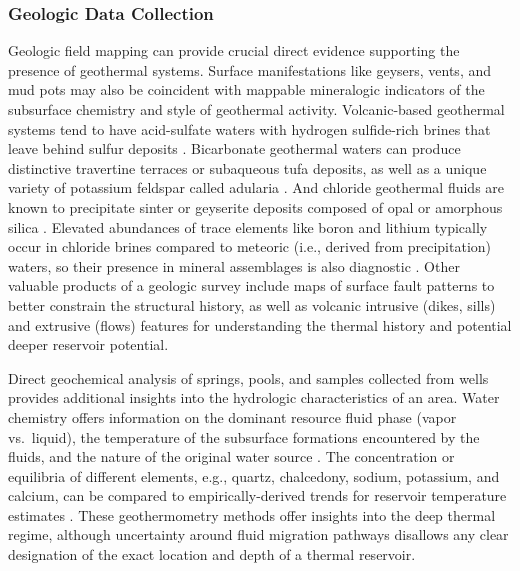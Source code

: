 \subsubsection{Geologic Data Collection}\label{ch2:geologic_data}
Geologic field mapping can provide crucial direct evidence supporting the presence of geothermal systems. Surface manifestations like geysers, vents, and mud pots may also be coincident with mappable mineralogic indicators of the subsurface chemistry and style of geothermal activity. Volcanic-based geothermal systems tend to have acid-sulfate waters with hydrogen sulfide-rich brines that leave behind sulfur deposits \citep[p.\ 123]{glassley_geothermal_2015}. Bicarbonate geothermal waters can produce distinctive travertine terraces or subaqueous tufa deposits, as well as a unique variety of potassium feldspar called adularia \citep[p.\ 125]{glassley_geothermal_2015}. And chloride geothermal fluids are known to precipitate sinter or geyserite deposits composed of opal or amorphous silica \citep[p.\ 125]{glassley_geothermal_2015}. Elevated abundances of trace elements like boron and lithium typically occur in chloride brines compared to meteoric (i.e., derived from precipitation) waters, so their presence in mineral assemblages is also diagnostic \citep{bielicki_hydrogeolgic_2015, millot_multi-isotopic_2007}. Other valuable products of a geologic survey include maps of surface fault patterns to better constrain the structural history, as well as volcanic intrusive (dikes, sills) and extrusive (flows) features for understanding the thermal history and potential deeper reservoir potential.

Direct geochemical analysis of springs, pools, and samples collected from wells provides additional insights into the hydrologic characteristics of an area. Water chemistry offers information on the dominant resource fluid phase (vapor vs.\ liquid), the temperature of the subsurface formations encountered by the fluids, and the nature of the original water source \citep[p.\ 25]{dipippo_geothermal_2012}. The concentration or equilibria of different elements, e.g., quartz, chalcedony, sodium, potassium, and calcium, can be compared to empirically-derived trends for reservoir temperature estimates \citep[p.\ 157]{glassley_geothermal_2015}. These geothermometry methods offer insights into the deep thermal regime, although uncertainty around fluid migration pathways disallows any clear designation of the exact location and depth of a thermal reservoir.


